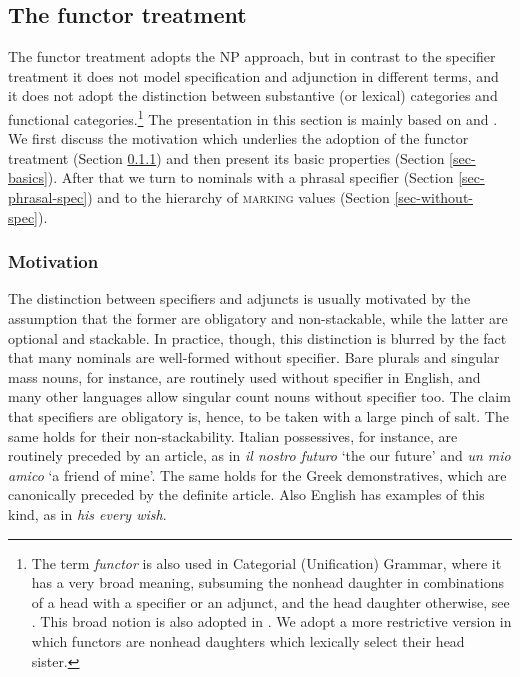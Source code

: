 \documentclass[output=paper
                ,modfonts
                ,nonflat
	        ,collection
	        ,collectionchapter
	        ,collectiontoclongg
 	        ,biblatex
                ,babelshorthands
                ,newtxmath
                ,draftmode
                ,colorlinks, citecolor=brown
]{./langsci/langscibook}
\begin{document}
\subsection{The functor treatment} 
\label{funct}


The functor treatment adopts the NP approach, but in contrast to the specifier treatment 
it does not model specification and adjunction in different terms, and it does not adopt 
the distinction between substantive (or lexical) categories and functional 
categories.\footnote{The term \emph{functor} is also used in Categorial (Unification) Grammar, 
where it has a very broad meaning, subsuming the nonhead daughter in combinations of a 
head with a specifier or an adjunct, and the head daughter otherwise, 
see \citet{Bouma88}. This broad notion is also adopted in 
\citet{Reape94}. We adopt a more restrictive version in which functors 
are nonhead daughters which lexically select their head sister.}  
The presentation in this section is mainly based on \citet{VanEynde06} 
and \citet{Allegranza06}. We first discuss the motivation which underlies the adoption 
of the functor treatment (Section \ref{motiv}) and then present its basic
properties (Section \ref{sec-basics}). After that we turn to nominals with a 
phrasal specifier (Section \ref{sec-phrasal-spec}) 
and to the hierarchy of \textsc{marking} values (Section \ref{sec-without-spec}).    


\subsubsection{Motivation} 
\label{motiv}


The distinction between specifiers and adjuncts is usually motivated by 
the assumption that the former are obligatory and non-stackable, while the latter  
are optional and stackable. In practice, though, this distinction 
is blurred by the fact that many nominals are well-formed without specifier.
Bare plurals and singular mass nouns, for instance, are routinely used without 
specifier in English, and many other languages allow singular count nouns without 
specifier too. The claim that specifiers are obligatory is, hence, to be taken 
with a large pinch of salt. The same holds for their non-stackability. 
Italian possessives, for instance, are routinely preceded by an article, as in 
\emph{il nostro futuro} `the our future' and \emph{un mio amico} `a friend of mine'.     
The same holds for the Greek demonstratives, which are canonically preceded by the 
definite article. Also English has examples of this kind, as in \emph{his every wish}.    
\end{document}
